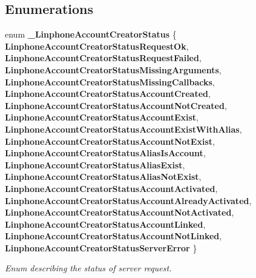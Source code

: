 \subsection*{Enumerations}
\begin{DoxyCompactItemize}
\item 
enum \textbf{ \+\_\+\+Linphone\+Account\+Creator\+Status} \{ \newline
\textbf{ Linphone\+Account\+Creator\+Status\+Request\+Ok}, 
\newline
\textbf{ Linphone\+Account\+Creator\+Status\+Request\+Failed}, 
\newline
\textbf{ Linphone\+Account\+Creator\+Status\+Missing\+Arguments}, 
\newline
\textbf{ Linphone\+Account\+Creator\+Status\+Missing\+Callbacks}, 
\newline
\textbf{ Linphone\+Account\+Creator\+Status\+Account\+Created}, 
\newline
\textbf{ Linphone\+Account\+Creator\+Status\+Account\+Not\+Created}, 
\newline
\textbf{ Linphone\+Account\+Creator\+Status\+Account\+Exist}, 
\newline
\textbf{ Linphone\+Account\+Creator\+Status\+Account\+Exist\+With\+Alias}, 
\newline
\textbf{ Linphone\+Account\+Creator\+Status\+Account\+Not\+Exist}, 
\newline
\textbf{ Linphone\+Account\+Creator\+Status\+Alias\+Is\+Account}, 
\newline
\textbf{ Linphone\+Account\+Creator\+Status\+Alias\+Exist}, 
\newline
\textbf{ Linphone\+Account\+Creator\+Status\+Alias\+Not\+Exist}, 
\newline
\textbf{ Linphone\+Account\+Creator\+Status\+Account\+Activated}, 
\newline
\textbf{ Linphone\+Account\+Creator\+Status\+Account\+Already\+Activated}, 
\newline
\textbf{ Linphone\+Account\+Creator\+Status\+Account\+Not\+Activated}, 
\newline
\textbf{ Linphone\+Account\+Creator\+Status\+Account\+Linked}, 
\newline
\textbf{ Linphone\+Account\+Creator\+Status\+Account\+Not\+Linked}, 
\newline
\textbf{ Linphone\+Account\+Creator\+Status\+Server\+Error}
 \}\begin{DoxyCompactList}\small\item\em Enum describing the status of server request. \end{DoxyCompactList}
\end{DoxyCompactItemize}
